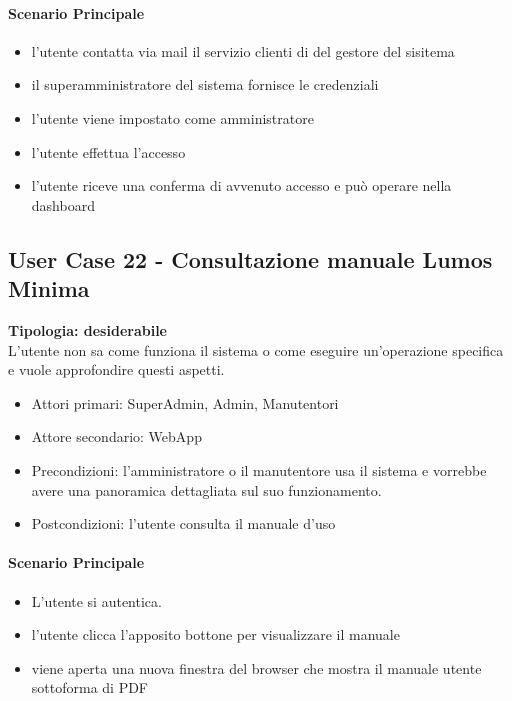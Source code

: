 \documentclass[12pt]{article}
\begin{document}
\paragraph{Scenario Principale}
\begin{itemize}
	\item l'utente contatta via mail il servizio clienti di del gestore del sisitema
	\item il superamministratore del sistema fornisce le credenziali
	\item l'utente viene impostato come amministratore
	\item l'utente effettua l'accesso
	\item l'utente riceve una conferma di avvenuto accesso e può operare nella dashboard
\end{itemize}

\subsection{User Case 22 - Consultazione manuale Lumos Minima}
\textbf{Tipologia: desiderabile}\\
L'utente non sa come funziona il sistema o come eseguire un'operazione specifica e vuole approfondire questi aspetti.
\begin{itemize}
	\item Attori primari: SuperAdmin, Admin, Manutentori
	\item Attore secondario: WebApp
	\item Precondizioni: l'amministratore o il manutentore usa il sistema e vorrebbe avere una panoramica dettagliata sul suo funzionamento.
	\item Postcondizioni: l'utente consulta il manuale d'uso
\end{itemize}
\paragraph{Scenario Principale}
\begin{itemize}
	\item L'utente si autentica.
	\item l'utente clicca l'apposito bottone per visualizzare il manuale
	\item viene aperta una nuova finestra del browser che mostra il manuale utente sottoforma di PDF
\end{itemize}
\end{document}
